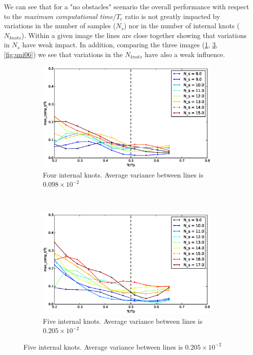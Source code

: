 We can see that for a "no obstacles" scenario the overall performance with respect to the \textit{maximum computational time}/$T_c$ ratio is not greatly impacted by variations in the number of samples ($N_s$) nor in the number of internal knots ($N_{knots}$). Within a given image the lines are close together showing that variations in $N_s$ have weak impact. In addition, comparing the three images (\ref{fig:uni04}, \ref{fig:uni05}, \ref{fig:uni06}) we see that variations in the $N_{knots}$ have also a weak influence.

\begin{figure}[!h]
        \centering
        \begin{subfigure}[b]{0.48\textwidth}
                \includegraphics[width=\textwidth]{./img/realtime/Scenario_0__N_knots_4/mcttc-tctp.eps}
                \caption{Four internal knots. Average variance between lines is $0.098\times 10^{-2}$}\label{fig:uni04}
        \end{subfigure}%
        ~ %
        \begin{subfigure}[b]{0.48\textwidth}
                \includegraphics[width=\textwidth]{./img/realtime/Scenario_0__N_knots_5/mcttc-tctp.eps}
                \caption{Five internal knots. Average variance between lines is $0.205\times 10^{-2}$}\label{fig:uni05}
        \end{subfigure}%
        

\end{figure}
